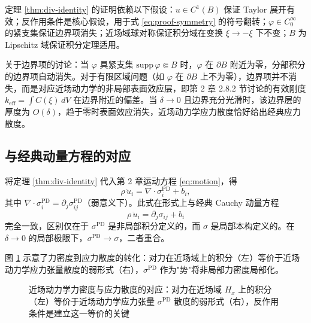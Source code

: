定理 \ref{thm:div-identity} 的证明依赖以下假设：$u\in C^1(B)$ 保证 Taylor 展开有效；反作用条件是核心假设，用于式 \eqref{eq:proof-symmetry} 的符号翻转；$\varphi\in C_0^\infty$ 的紧支集保证边界项消失；近场域球对称保证积分域在变换 $\xi\to-\xi$ 下不变；$B$ 为 Lipschitz 域保证积分定理适用。

关于边界项的讨论：当 $\varphi$ 具紧支集 $\mathrm{supp}\,\varphi\Subset B$ 时，$\varphi$ 在 $\partial B$ 附近为零，分部积分的边界项自动消失。对于有限区域问题（如 $\varphi$ 在 $\partial B$ 上不为零），边界项并不消失，而是对应近场动力学的非局部表面效应层，即第 2 章 2.8.2 节讨论的有效刚度 $k_{\mathrm{eff}}=\int C(\xi)\,dV$ 在边界附近的偏差。当 $\delta\to 0$ 且边界充分光滑时，该边界层的厚度为 $O(\delta)$，趋于零时表面效应消失，近场动力学应力散度恰好给出经典应力散度。

\subsection{与经典动量方程的对应}
\label{subsec:ccm-correspondence}

将定理 \ref{thm:div-identity} 代入第 2 章运动方程 \eqref{eq:motion}，得
\begin{equation}
\label{eq:pd-motion-stress}
\rho\,\ddot{u}_i = \nabla\cdot\sigma^{\mathrm{PD}}_{i} + b_i,
\end{equation}
其中 $\nabla\cdot\sigma^{\mathrm{PD}}_i=\partial_j\sigma^{\mathrm{PD}}_{ij}$（弱意义下）。此式在形式上与经典 Cauchy 动量方程
\begin{equation}
\label{eq:ccm-motion}
\rho\,\ddot{u}_i = \partial_j\sigma_{ij} + b_i
\end{equation}
完全一致，区别仅在于 $\sigma^{\mathrm{PD}}$ 是非局部积分定义的，而 $\sigma$ 是局部本构定义的。在 $\delta\to 0$ 的局部极限下，$\sigma^{\mathrm{PD}}\to\sigma$，二者重合。

图 \ref{fig:force-to-stress} 示意了力密度到应力散度的转化：对力在近场域上的积分（左）等价于近场动力学应力张量散度的弱形式（右），$\sigma^{\mathrm{PD}}$ 作为"势"将非局部力密度局部化。

\begin{figure}[htbp]
\centering
{}
\caption{近场动力学力密度与应力散度的对应：对力在近场域 $H_x$ 上的积分（左）等价于近场动力学应力张量 $\sigma^{\mathrm{PD}}$ 散度的弱形式（右），反作用条件是建立这一等价的关键}
\label{fig:force-to-stress}
\end{figure}

